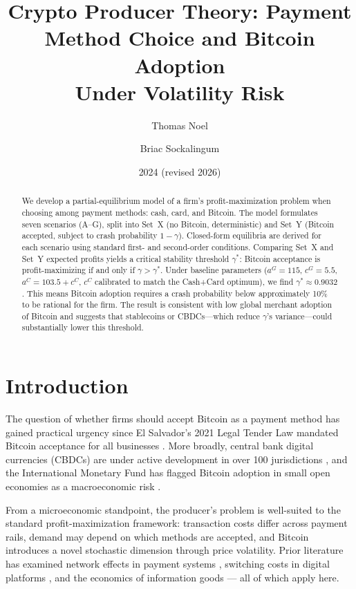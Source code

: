 \documentclass{article}
\title{Crypto Producer Theory: Payment Method Choice and Bitcoin Adoption\\
       Under Volatility Risk}
\author{Thomas Noel \and Briac Sockalingum}
\date{2024 (revised 2026)}
\begin{document}
\maketitle

\begin{abstract}
We develop a partial-equilibrium model of a firm's profit-maximization problem
when choosing among payment methods: cash, card, and Bitcoin.
The model formulates seven scenarios (A--G), split into Set~X (no Bitcoin,
deterministic) and Set~Y (Bitcoin accepted, subject to crash probability
$1 - \gamma$).
Closed-form equilibria are derived for each scenario using standard first- and
second-order conditions.
Comparing Set~X and Set~Y expected profits yields a critical stability threshold
$\gamma^*$: Bitcoin acceptance is profit-maximizing if and only if $\gamma > \gamma^*$.
Under baseline parameters ($a^G = 115$, $c^G = 5.5$, $a^C = 103.5 + c^C$,
$c^C$ calibrated to match the Cash+Card optimum), we find $\gamma^* \approx 0.9032$.
This means Bitcoin adoption requires a crash probability below approximately 10\%
to be rational for the firm.
The result is consistent with low global merchant adoption of Bitcoin and
suggests that stablecoins or CBDCs---which reduce $\gamma$'s variance---could
substantially lower this threshold.
\end{abstract}

\section{Introduction}

The question of whether firms should accept Bitcoin as a payment method has
gained practical urgency since El Salvador's 2021 Legal Tender Law mandated
Bitcoin acceptance for all businesses \citep{elsalvador2021}.
More broadly, central bank digital currencies (CBDCs) are under active
development in over 100 jurisdictions \citep{bis2023}, and the International
Monetary Fund has flagged Bitcoin adoption in small open economies as a
macroeconomic risk \citep{imf2022}.

From a microeconomic standpoint, the producer's problem is well-suited to the
standard profit-maximization framework: transaction costs differ across payment
rails, demand may depend on which methods are accepted, and Bitcoin introduces
a novel stochastic dimension through price volatility.
Prior literature has examined network effects in payment systems
\citep{rochet2003}, switching costs in digital platforms \citep{farrell1987},
and the economics of information goods \citep{shapiro1998} --- all of which
apply here.
\end{document}
